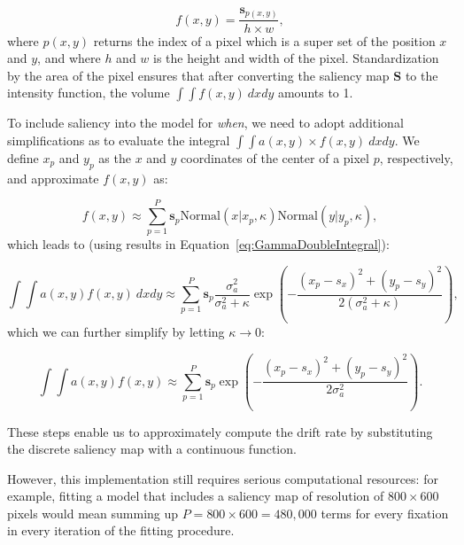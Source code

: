 \documentclass{article}
\begin{document}
\begin{equation}
\label{eq:saliency_where}
    f(x, y) = \frac{\mathbf{s}_{p(x,y)} }{h \times w},
\end{equation}
where $p(x, y)$ returns the index of a pixel which is a super set of the position $x$ and $y$, and where $h$ and $w$ is the height and width of the pixel. Standardization by the area of the pixel ensures that after converting the saliency map $\mathbf{S}$ to the intensity function, the volume $\int \int f(x, y)~dxdy$ amounts to 1.

To include saliency into the model for \textit{when}, we need to adopt additional simplifications as to evaluate the integral $\int \int a(x, y) \times f(x, y)~dxdy$. We define $x_p$ and $y_p$ as the $x$ and $y$ coordinates of the center of a pixel $p$, respectively, and approximate $f(x, y)$ as:

\begin{equation}
    f(x, y) \approx \sum_{p=1}^P \mathbf{s}_{p} \text{Normal}(x | x_p, \kappa)\text{Normal}(y | y_p, \kappa),
\end{equation}
which leads to (using results in Equation~\ref{eq:GammaDoubleIntegral}):

\begin{equation}
    \int \int a(x, y)f(x, y)~dx dy\approx \sum_{p=1}^P \mathbf{s}_{p} \frac{\sigma_a^2}{\sigma_a^2 + \kappa } \exp\left(-\frac{(x_p - s_x)^2+(y_p - s_y)^2}{2(\sigma_a^2 + \kappa)}\right),
\end{equation}
which we can further simplify by letting $\kappa \rightarrow 0$:

\begin{equation}
    \int \int a(x, y)f(x, y) \approx \sum_{p=1}^P \mathbf{s}_{p} \exp\left(-\frac{(x_p - s_x)^2+(y_p - s_y)^2}{2\sigma_a^2}\right).
\end{equation}

These steps enable us to approximately compute the drift rate by substituting the discrete saliency map with a continuous function.

However, this implementation still requires serious computational resources: for example, fitting a model that includes a saliency map of resolution of $800\times600$ pixels would mean summing up $P = 800\times600 = 480,000$ terms for every fixation in every iteration of the fitting procedure.
\end{document}

